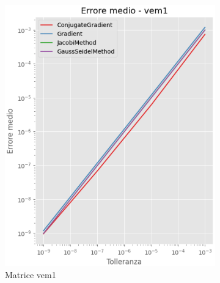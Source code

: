 \begin{figure}[!ht]
\begin{subfigure}{0.45\textwidth}
        \includegraphics[width=\textwidth]{./../report/Progetto_1_bis/img/error_vem1.png}
        \caption{Matrice vem1}
        \label{fig:error_vem1}
    \end{subfigure}
    \begin{subfigure}{0.45\textwidth}
        \centering

\end{subfigure}
\end{figure}
